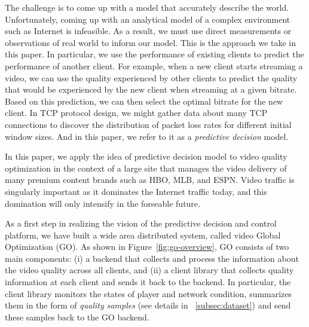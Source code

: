 The challenge is to come up with a model that accurately describe the
world. Unfortunately, coming up with an analytical model of a complex
environment such as Internet is infeasible. As a result, we must use
direct measurements or observations of real world to inform our
model. This is the approach we take in this paper. In particular, we
use the performance of existing clients to predict the performance of
another client. For example, when a new client starts streaming a
video, we can use the quality experienced by other clients to predict
the quality that would be experienced by the new client when streaming
at a given bitrate. Based on this prediction, we can then select the
optimal bitrate for the new client.  In TCP protocol design, we might
gather data about many TCP connections to discover the distribution of
packet loss rates for different initial window sizes.  
And in this paper, we refer to it as a {\it predictive decision} model.



\label{subsec:gooverview}

In this paper, we apply the idea of predictive decision model to video
quality optimization in the context of a large site that manages the
video delivery of many premium content brands such as HBO, MLB, and
ESPN. Video traffic is singularly important as it dominates the
Internet traffic today, and this domination will only intensify in the
forseable future.

As a first step in realizing the vision of the predictive decision and control 
platform, we have built a wide area distributed system, called video Global 
Optimization (GO). As shown in
Figure~\ref{fig:go-overview}, GO consists of two main components: (i)
a backend that collects and process the information about the video
quality across all clients, and (ii) a client library that collects
quality information at each client and sends it back to the backend. In
particular, the client library monitors the states of player and
network condition, summarizes them in the form of \emph{quality
  samples} (see details in \Section~\ref{subsec:dataset}) and send
these samples back to the GO backend.

